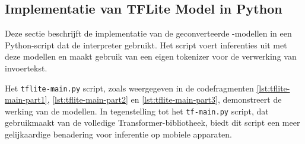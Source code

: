 \subsection{Implementatie van TFLite Model in Python}

Deze sectie beschrijft de implementatie van de geconverteerde -modellen in een Python-script dat de  interpreter  gebruikt. Het script voert inferenties uit met deze modellen en maakt gebruik van een eigen tokenizer voor de verwerking van invoertekst.

Het \texttt{tflite-main.py} script, zoals weergegeven in de codefragmenten \ref{lst:tflite-main-part1}, \ref{lst:tflite-main-part2} en \ref{lst:tflite-main-part3}, demonstreert de werking van de  modellen. In tegenstelling tot het \texttt{tf-main.py} script, dat gebruikmaakt van de volledige Transformer-bibliotheek, biedt dit script een meer gelijkaardige benadering voor inferentie op mobiele apparaten.

